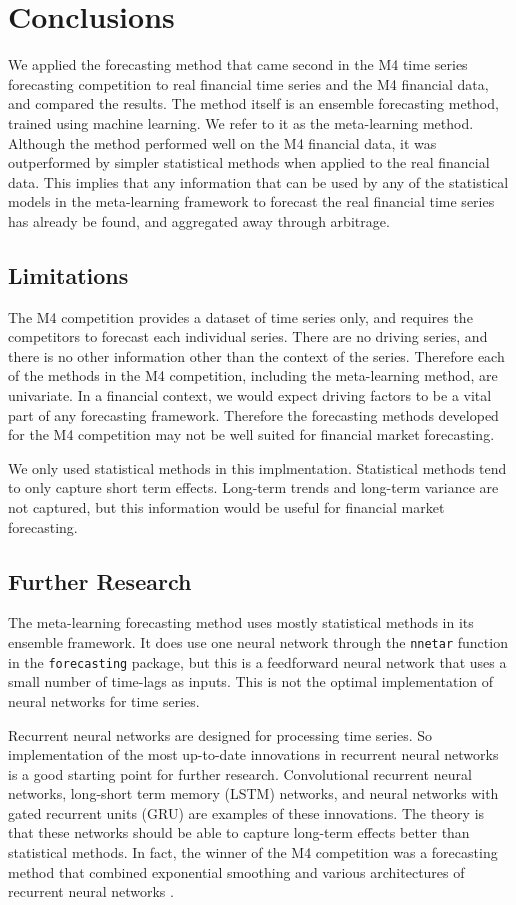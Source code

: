 \documentclass[a4paper,12pt]{article}
\theoremstyle{definition}
\begin{document}
\section{Conclusions}
We applied the forecasting method that came second in the M4 time series forecasting competition to real financial time series and the M4 financial data, and compared the results. The method itself is an ensemble forecasting method, trained using machine learning. We refer to it as the meta-learning method. Although the method performed well on the M4 financial data, it was outperformed by simpler statistical methods when applied to the real financial data. This implies that any information that can be used by any of the statistical models in the meta-learning framework to forecast the real financial time series has already be found, and aggregated away through arbitrage.

\subsection{Limitations}
The M4 competition provides a dataset of time series only, and requires the competitors to forecast each individual series. There are no driving series, and there is no other information other than the context of the series. Therefore each of the methods in the M4 competition, including the meta-learning method, are univariate. In a financial context, we would expect driving factors to be a vital part of any forecasting framework. Therefore the forecasting methods developed for the M4 competition may not be well suited for financial market forecasting. 

We only used statistical methods in this implmentation. Statistical methods tend to only capture short term effects. Long-term trends and long-term variance are not captured, but this information would be useful for financial market forecasting. 

\subsection{Further Research}
The meta-learning forecasting method uses mostly statistical methods in its ensemble framework. It does use one neural network through the \texttt{nnetar} function in the \texttt{forecasting} package, but this is a feedforward neural network that uses a small number of time-lags as inputs. This is not the optimal implementation of neural networks for time series. 

Recurrent neural networks are designed for processing time series. So implementation of the most up-to-date innovations in recurrent neural networks is a good starting point for further research. Convolutional recurrent neural networks, long-short term memory (LSTM) networks, and neural networks with gated recurrent units (GRU) are examples of these innovations. The theory is that these networks should be able to capture long-term effects better than statistical methods. In fact, the winner of the M4 competition was a forecasting method that combined exponential smoothing and various architectures of recurrent neural networks \cite{m4}.

\newpage


\end{document}
